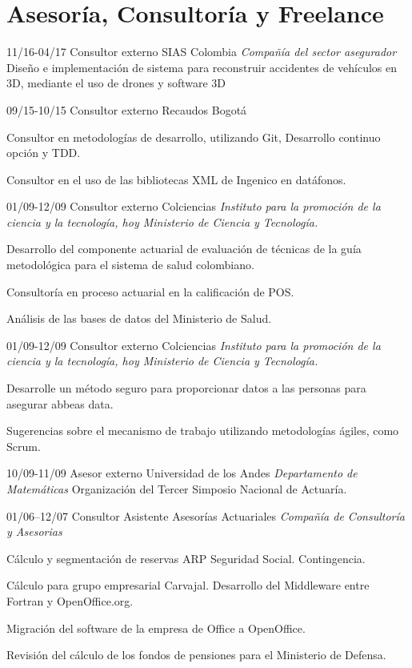 \section{Asesoría, Consultoría y Freelance}
\begin{entrylist}

  \entry
	{11/16-04/17}
	{Consultor externo}
	{SIAS Colombia {\sl Compañía del sector asegurador}}
	{Diseño e implementación de sistema para reconstruir accidentes de vehículos en 3D,
	mediante el uso de drones y software 3D}

  \entry
	{09/15-10/15}
	{Consultor externo}
	{Recaudos Bogotá}
        {Consultor en metodologías de desarrollo, utilizando Git, Desarrollo continuo
opción y TDD.

	Consultor en el uso de las bibliotecas XML de Ingenico en datáfonos.}

  \entry
	{01/09-12/09}
	{Consultor externo}
	{Colciencias {\sl Instituto para la promoción de la ciencia y la tecnología, hoy Ministerio de Ciencia y Tecnología.}}
{Desarrollo del componente actuarial de evaluación de técnicas de la guía metodológica para
el sistema de salud colombiano.

Consultoría en proceso actuarial en la calificación de POS.

	Análisis de las bases de datos del Ministerio de Salud.}

\end{entrylist}

\newpage
\begin{entrylist}
  \entry
	{01/09-12/09}
	{Consultor externo}
	{Colciencias {\sl Instituto para la promoción de la ciencia y la tecnología, hoy Ministerio de Ciencia y Tecnología.}}
        {Desarrolle un método seguro para proporcionar datos a las personas para asegurar abbeas data.

	Sugerencias sobre el mecanismo de trabajo utilizando metodologías ágiles, como Scrum.}

  \entry
	{10/09-11/09}
	{Asesor externo}
	{Universidad de los Andes {\sl Departamento de Matemáticas}}
	{Organización del Tercer Simposio Nacional de Actuaría.}

  \entry
	{01/06–12/07}
	{Consultor Asistente}
	{Asesorías Actuariales {\sl Compañía de Consultoría y Asesorias}}
	{Cálculo y segmentación de reservas ARP Seguridad Social. Contingencia.

Cálculo para grupo empresarial Carvajal. Desarrollo del Middleware
entre Fortran y OpenOffice.org.

Migración del software de la empresa de Office a OpenOffice.

Revisión del cálculo de los fondos de pensiones para el Ministerio de
Defensa.}

\end{entrylist}
